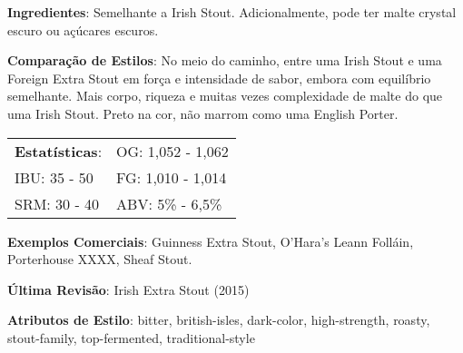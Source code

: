 \textbf{Ingredientes}: Semelhante a Irish Stout. Adicionalmente, pode ter malte crystal escuro ou açúcares escuros.

\textbf{Comparação de Estilos}: No meio do caminho, entre uma Irish Stout e uma Foreign Extra Stout em força e intensidade de sabor, embora com equilíbrio semelhante. Mais corpo, riqueza e muitas vezes complexidade de malte do que uma Irish Stout. Preto na cor, não marrom como uma English Porter.

\begin{tabular}{@{}p{35mm}p{35mm}@{}}
  \textbf{Estatísticas}: & OG: 1,052 - 1,062 \\
  IBU: 35 - 50  & FG: 1,010 - 1,014 \\
  SRM: 30 - 40  & ABV: 5\% - 6,5\%
\end{tabular}

\textbf{Exemplos Comerciais}: Guinness Extra Stout, O'Hara's Leann Folláin, Porterhouse XXXX, Sheaf Stout.

\textbf{Última Revisão}: Irish Extra Stout (2015)

\textbf{Atributos de Estilo}: bitter, british-isles, dark-color, high-strength, roasty, stout-family, top-fermented, traditional-style
